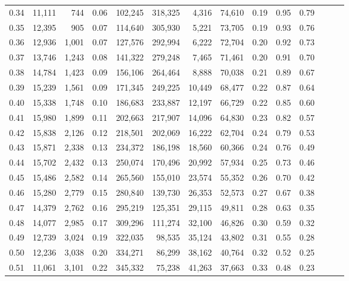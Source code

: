 \begin{tabular}{rrrrrrrrrrrrrr}
0.34 &  11,111 &    744 &  0.06 &  102,245 &  318,325 &   4,316 &  74,610 &  0.19 &  0.95 &      0.79 \\
0.35 &  12,395 &    905 &  0.07 &  114,640 &  305,930 &   5,221 &  73,705 &  0.19 &  0.93 &      0.76 \\
0.36 &  12,936 &  1,001 &  0.07 &  127,576 &  292,994 &   6,222 &  72,704 &  0.20 &  0.92 &      0.73 \\
0.37 &  13,746 &  1,243 &  0.08 &  141,322 &  279,248 &   7,465 &  71,461 &  0.20 &  0.91 &      0.70 \\
0.38 &  14,784 &  1,423 &  0.09 &  156,106 &  264,464 &   8,888 &  70,038 &  0.21 &  0.89 &      0.67 \\
0.39 &  15,239 &  1,561 &  0.09 &  171,345 &  249,225 &  10,449 &  68,477 &  0.22 &  0.87 &      0.64 \\
0.40 &  15,338 &  1,748 &  0.10 &  186,683 &  233,887 &  12,197 &  66,729 &  0.22 &  0.85 &      0.60 \\
0.41 &  15,980 &  1,899 &  0.11 &  202,663 &  217,907 &  14,096 &  64,830 &  0.23 &  0.82 &      0.57 \\
0.42 &  15,838 &  2,126 &  0.12 &  218,501 &  202,069 &  16,222 &  62,704 &  0.24 &  0.79 &      0.53 \\
0.43 &  15,871 &  2,338 &  0.13 &  234,372 &  186,198 &  18,560 &  60,366 &  0.24 &  0.76 &      0.49 \\
0.44 &  15,702 &  2,432 &  0.13 &  250,074 &  170,496 &  20,992 &  57,934 &  0.25 &  0.73 &      0.46 \\
0.45 &  15,486 &  2,582 &  0.14 &  265,560 &  155,010 &  23,574 &  55,352 &  0.26 &  0.70 &      0.42 \\
0.46 &  15,280 &  2,779 &  0.15 &  280,840 &  139,730 &  26,353 &  52,573 &  0.27 &  0.67 &      0.38 \\
0.47 &  14,379 &  2,762 &  0.16 &  295,219 &  125,351 &  29,115 &  49,811 &  0.28 &  0.63 &      0.35 \\
0.48 &  14,077 &  2,985 &  0.17 &  309,296 &  111,274 &  32,100 &  46,826 &  0.30 &  0.59 &      0.32 \\
0.49 &  12,739 &  3,024 &  0.19 &  322,035 &   98,535 &  35,124 &  43,802 &  0.31 &  0.55 &      0.28 \\
0.50 &  12,236 &  3,038 &  0.20 &  334,271 &   86,299 &  38,162 &  40,764 &  0.32 &  0.52 &      0.25 \\
0.51 &  11,061 &  3,101 &  0.22 &  345,332 &   75,238 &  41,263 &  37,663 &  0.33 &  0.48 &      0.23 \\

\end{tabular}
